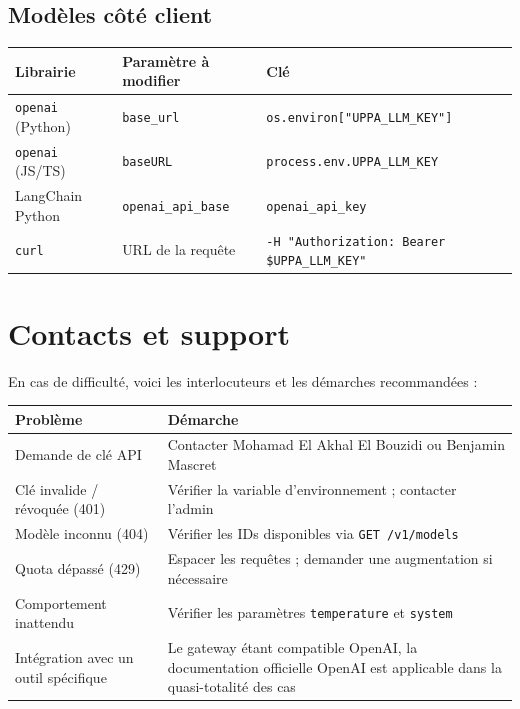 \documentclass[12pt, a4paper, twoside]{article}
\begin{document}
\subsection{Modèles côté client}

\begin{center}
\small
\begin{tabular}{L{4.5cm} L{4cm} L{4cm}}
  \toprule
  \textbf{Librairie} & \textbf{Paramètre à modifier} & \textbf{Clé} \\
  \midrule
  \texttt{openai} (Python) & \texttt{base\_url} & \texttt{os.environ["UPPA\_LLM\_KEY"]} \\
  \texttt{openai} (JS/TS)  & \texttt{baseURL}   & \texttt{process.env.UPPA\_LLM\_KEY} \\
  LangChain Python         & \texttt{openai\_api\_base} & \texttt{openai\_api\_key} \\
  \texttt{curl}            & URL de la requête  & \texttt{-H "Authorization: Bearer \$UPPA\_LLM\_KEY"} \\
  \bottomrule
\end{tabular}
\end{center}

\section*{Contacts et support}

En cas de difficulté, voici les interlocuteurs et les démarches recommandées :

\begin{center}
\begin{tabular}{L{5cm} L{8.5cm}}
  \toprule
  \textbf{Problème} & \textbf{Démarche} \\
  \midrule
  Demande de clé API & Contacter Mohamad El Akhal El Bouzidi ou Benjamin Mascret \\
  Clé invalide / révoquée (401) & Vérifier la variable d'environnement ; contacter l'admin \\
  Modèle inconnu (404) & Vérifier les IDs disponibles via \texttt{GET /v1/models} \\
  Quota dépassé (429) & Espacer les requêtes ; demander une augmentation si nécessaire \\
  Comportement inattendu & Vérifier les paramètres \texttt{temperature} et \texttt{system} \\
  Intégration avec un outil spécifique & Le gateway étant compatible OpenAI, la documentation
    officielle OpenAI est applicable dans la quasi-totalité des cas \\
  \bottomrule
\end{tabular}
\end{center}
\end{document}
